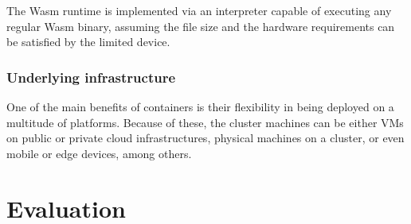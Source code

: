 The Wasm runtime is implemented via an interpreter capable of executing any regular Wasm binary, assuming the file size and the hardware requirements can be satisfied by the limited device.

\subsubsection{Underlying infrastructure}

One of the main benefits of containers is their flexibility in being deployed on a multitude of platforms. Because of these, the cluster machines can be either VMs on public or private cloud infrastructures, physical machines on a cluster, or even mobile or edge devices, among others.

\section{Evaluation}
\label{sec:evaluation}






